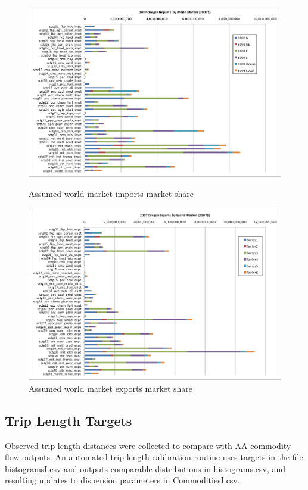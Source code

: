\begin{figure}   %
\centering
\includegraphics[width=6.0in]{aa/world-imports}
\caption{Assumed world market imports market share}\label{fig:aa-world-imports}
\includegraphics[width=6.0in]{aa/world-exports}
\caption{Assumed world market exports market share}\label{fig:aa-world-exports}
\end{figure}
 
\subsection{Trip Length Targets}\label{sec:aa-trip-length-targets}
Observed trip length distances were collected to compare with AA commodity flow outputs. An automated trip length calibration routine uses targets in the file histogramsI.csv and outputs comparable distributions in histograms.csv, and resulting updates to dispersion parameters in CommoditiesI.csv.

